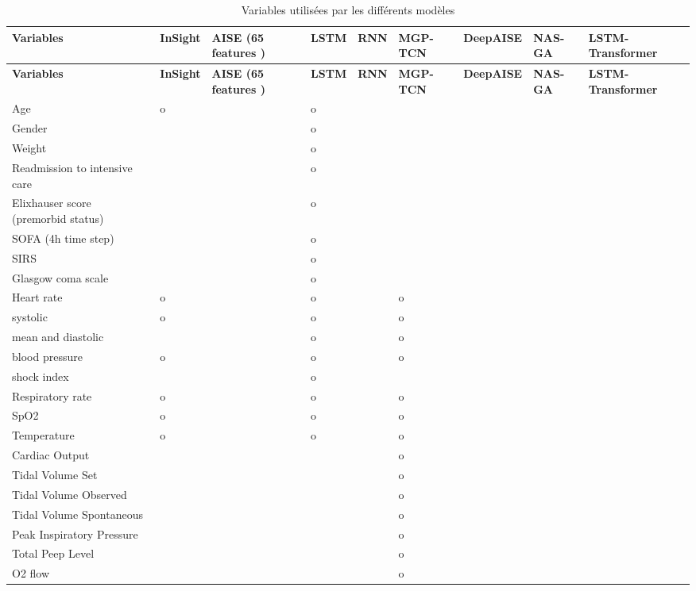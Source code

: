 \documentclass[a4paper,12pt]{article}
\begin{document}
\begin{longtable}{|p{3.5cm}|p{1cm}|p{1cm}|p{1cm}|p{1cm}|p{1cm}|p{1cm}|p{1cm}|p{1cm}|}
    \caption{Variables utilisées par les différents modèles} \label{tab:variables_modeles} \\
    \hline
    \textbf{Variables} & \textbf{InSight} & \textbf{AISE (65 features \cite{nemati2018interpretable})} & \textbf{LSTM} & \textbf{RNN} & \textbf{MGP-TCN} & \textbf{DeepAISE} & \textbf{NAS-GA} & \textbf{LSTM-Transformer} \\
    \hline
    \endfirsthead

    \hline
    \textbf{Variables} & \textbf{InSight} & \textbf{AISE (65 features \cite{nemati2018interpretable})} & \textbf{LSTM}  & \textbf{RNN} & \textbf{MGP-TCN} & \textbf{DeepAISE} & \textbf{NAS-GA} & \textbf{LSTM-Transformer} \\
    \hline
    \endhead

    \hline
    \endfoot

    \hline
    \endlastfoot

    Age & o & & o & & & & & \\
    Gender & & & o & & & & & \\
    Weight & & & o & & & & & \\
    Readmission to intensive care & & & o & & & & & \\
    Elixhauser score (premorbid status) & & & o & & & & & \\
    
    \hline
    SOFA (4h time step) & & & o & & & & & \\
    SIRS & & & o & & & & & \\
    Glasgow coma scale & & & o & & & & & \\
    Heart rate & o & & o & & o & & & \\
    systolic & o & & o & & o & & & \\
    mean and diastolic & & & o & & o & & & \\
    blood pressure & o & & o & & o & & & \\
    shock index & & & o & & & & & \\
    Respiratory rate & o & & o & & o & & & \\
    SpO2 & o & & o & & o & & & \\
    Temperature & o & & o & & o & & & \\
    Cardiac Output & & & & & o & & & \\
    Tidal Volume Set & & & & & o & & & \\
    Tidal Volume Observed & & & & & o & & & \\
    Tidal Volume Spontaneous & & & & & o & & & \\
    Peak Inspiratory Pressure & & & & & o & & & \\
    Total Peep Level & & & & & o & & & \\
    O2 flow & & & & & o & & & \\
    

\end{longtable}
\end{document}
